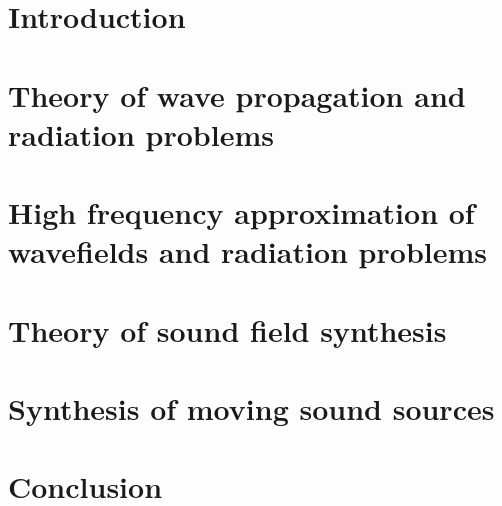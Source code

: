 \documentclass[%
	paper=A4,					%
	twoside=true,				%
	openright,					%
	chapterprefix=true,			%
	11pt,						%
	headings=normal,			%
	bibliography=totoc,			%
	listof=totoc,				%
	titlepage=on,				%
	captions=tableabove,		%
	draft=false,				%
]{scrreprt}
\begin{document}



\pagestyle{empty}				%
\cleardoublepage

%

\cleardoublepage

\pagestyle{plain}				%
\setcounter{tocdepth}{2}		%
\tableofcontents				%
\cleardoublepage
{}			%
\setcounter{page}{1}			%
\pagestyle{maincontentstyle} 	%

%

\chapter{Introduction}
\label{sec:introduction}

%
\chapter{Theory of wave propagation and radiation problems}
\label{sec:general_wave_theory}

\chapter{High frequency approximation of wavefields and radiation problems}
\label{sec:high_freq_approx}


\chapter{Theory of sound field synthesis}
\label{sec:sound_field_synthesis}


\chapter{Synthesis of moving sound sources}
\label{sec:moving_source_synthesis}


\chapter{Conclusion}
\label{sec:conclusion}

\end{document}
